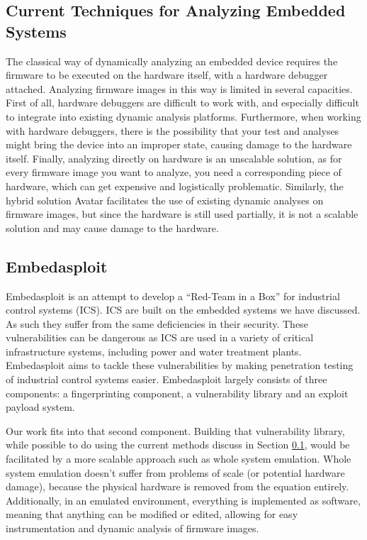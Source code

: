 \documentclass[letterpaper, 11 pt, conference]{ieeeconf}
\begin{document}
\subsection{Current Techniques for Analyzing Embedded Systems} \label{current}
The classical way of dynamically analyzing an embedded device requires the firmware to be executed on the hardware itself, with a hardware debugger attached. Analyzing firmware images in this way is limited in several capacities. First of all, hardware debuggers are difficult to work with, and especially difficult to integrate into existing dynamic analysis platforms. Furthermore, when working with hardware debuggers, there is the possibility that your test and analyses might bring the device into an improper state, causing damage to the hardware itself. Finally, analyzing directly on hardware is an unscalable solution, as for every firmware image you want to analyze, you need a corresponding piece of hardware, which can get expensive and logistically problematic. Similarly, the hybrid solution Avatar \cite{avatar} facilitates the use of existing dynamic analyses on firmware images, but since the hardware is still used partially, it is not a scalable solution and may cause damage to the hardware.

\subsection{Embedasploit} \label{embed}
Embedasploit is an attempt to develop a ``Red-Team in a Box'' for industrial control systems (ICS). ICS are built on the embedded systems we have discussed. As such they suffer from the same deficiencies in their security. These vulnerabilities can be dangerous as ICS are used in a variety of critical infrastructure systems, including power and water treatment plants. Embedasploit aims to tackle these vulnerabilities by making penetration testing of industrial control systems easier. Embedasploit largely consists of three components: a fingerprinting component, a vulnerability library and an exploit payload system. 

Our work fits into that second component. Building that vulnerability library, while possible to do using the current methods discuss in Section \ref{current}, would be facilitated by a more scalable approach such as whole system emulation. Whole system emulation doesn't suffer from problems of scale (or potential hardware damage), because the physical hardware is removed from the equation entirely. Additionally, in an emulated environment, everything is implemented as software, meaning that anything can be modified or edited, allowing for easy instrumentation and dynamic analysis of firmware images. 
\end{document}
